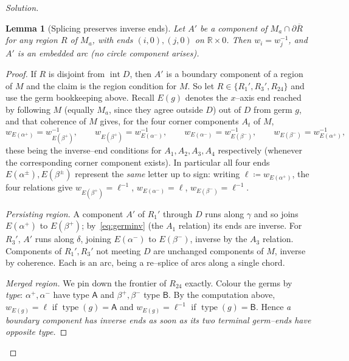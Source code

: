 \documentclass{amsart}
\newtheorem{lemma}{Lemma}
\theoremstyle{definition}
\newcommand{\RR}{\mathbb{R}}
\newcommand{\defeq}{\coloneqq}
\newcommand{\bdy}{\partial}
\begin{document}
\begin{proof}[Solution]
\begin{lemma}[Splicing preserves inverse ends]\label{lem:splice}
Let $A'$ be a component of $M_a\cap\bdy\overline R$ for any region $R$ of $M_a$, with ends
$(i,0),(j,0)$ on $\RR\times0$. Then $w_i=w_j^{-1}$, and $A'$ is an embedded arc (no circle
component arises).

\end{lemma}

\begin{proof}
If $R$ is disjoint from $\operatorname{int}D$, then $A'$ is a boundary component of a region of
$M$ and the claim is the region condition for $M$. So let $R\in\{R_1',R_3',R_{24}\}$ and use the
germ bookkeeping above. Recall $E(g)$ denotes the $x$--axis end reached by following $M$ (equally
$M_a$, since they agree outside $D$) out of $D$ from germ $g$, and that coherence of $M$ gives,
for the four corner components $A_t$ of $M$,
\begin{equation}\label{eq:germinv}
  w_{E(\alpha^+)}=w_{E(\beta^+)}^{-1},\qquad
  w_{E(\beta^+)}=w_{E(\alpha^-)}^{-1},\qquad
  w_{E(\alpha^-)}=w_{E(\beta^-)}^{-1},\qquad
  w_{E(\beta^-)}=w_{E(\alpha^+)}^{-1},
\end{equation}
these being the inverse--end conditions for $A_1,A_2,A_3,A_4$ respectively (whenever the
corresponding corner component exists). In particular all four ends $E(\alpha^\pm),E(\beta^\pm)$
represent the \emph{same} letter up to sign: writing $\ell\defeq w_{E(\alpha^+)}$, the four
relations give $w_{E(\beta^+)}=\ell^{-1}$, $w_{E(\alpha^-)}=\ell$, $w_{E(\beta^-)}=\ell^{-1}$.

\emph{Persisting region.} A component $A'$ of $R_1'$ through $D$ runs along $\gamma$ and so joins
$E(\alpha^+)$ to $E(\beta^+)$; by~\eqref{eq:germinv} (the $A_1$ relation) its ends are inverse.
For $R_3'$, $A'$ runs along $\delta$, joining $E(\alpha^-)$ to $E(\beta^-)$, inverse by the $A_3$
relation. Components of $R_1',R_3'$ not meeting $D$ are unchanged components of $M$, inverse by
coherence. Each is an arc, being a re--splice of arcs along a single chord.

\emph{Merged region.} We pin down the frontier of $R_{24}$ exactly. Colour the germs by
\emph{type}: $\alpha^+,\alpha^-$ have type $\mathsf A$ and $\beta^+,\beta^-$ type $\mathsf B$. By
the computation above, $w_{E(g)}=\ell$ if $\operatorname{type}(g)=\mathsf A$ and $w_{E(g)}=\ell^{-1}$
if $\operatorname{type}(g)=\mathsf B$. Hence \emph{a boundary component has inverse ends as soon as
its two terminal germ--ends have opposite type.}


\end{proof}
\end{proof}
\end{document}
